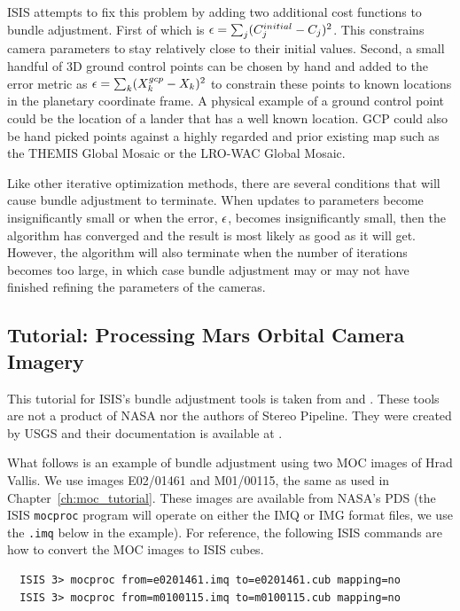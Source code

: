 \ac{ISIS} attempts to fix this problem by adding two additional cost
functions to bundle adjustment. First of which is ${\bf \epsilon} =
\sum_j(C_j^{initial}-C_j)^2$. This constrains camera parameters to
stay relatively close to their initial values. Second, a small handful
of 3D ground control points can be chosen by hand and added to the
error metric as ${\bf \epsilon} = \sum_k(X_k^{gcp}-X_k)^2$ to
constrain these points to known locations in the planetary coordinate
frame. A physical example of a ground control point could be the
location of a lander that has a well known location. GCP could also be
hand picked points against a highly regarded and prior existing map
such as the THEMIS Global Mosaic or the LRO-WAC Global Mosaic.

Like other iterative optimization methods, there are several
conditions that will cause bundle adjustment to terminate. When
updates to parameters become insignificantly small or when the error,
${\bf \epsilon}$, becomes insignificantly small, then the algorithm
has converged and the result is most likely as good as it will get.
However, the algorithm will also terminate when the number of
iterations becomes too large, in which case bundle adjustment may or
may not have finished refining the parameters of the cameras.

\subsection{Tutorial: Processing Mars Orbital Camera Imagery}
\label{sec:ba_example}

This tutorial for ISIS's bundle adjustment tools is taken from
\cite{lunokhod:controlnetwork} and \cite{lunokhod:gcp}. These tools
are not a product of NASA nor the authors of Stereo Pipeline. They
were created by USGS and their documentation is available at
\cite{isis:documentation}.

What follows is an example of bundle adjustment using two \ac{MOC}
images of Hrad Vallis. We use images E02/01461 and M01/00115, the same
as used in Chapter~\ref{ch:moc_tutorial}. These images are available from
NASA's \ac{PDS} (the \ac{ISIS} \texttt{mocproc} program will operate
on either the IMQ or IMG format files, we use the \texttt{.imq} below
in the example).  For reference, the following \ac{ISIS} commands are
how to convert the \ac{MOC} images to \ac{ISIS} cubes.

\begin{verbatim}
  ISIS 3> mocproc from=e0201461.imq to=e0201461.cub mapping=no
  ISIS 3> mocproc from=m0100115.imq to=m0100115.cub mapping=no
\end{verbatim}

